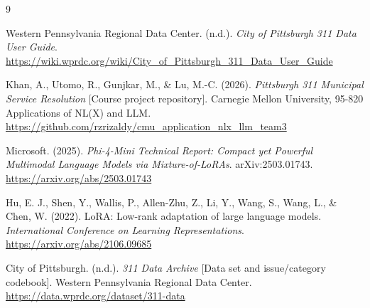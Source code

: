 \documentclass[11pt,letterpaper]{article}
\begin{document}
\begin{thebibliography}{9}
\raggedright
{} Western Pennsylvania Regional Data Center. (n.d.). \emph{City of Pittsburgh 311 Data User Guide}. \url{https://wiki.wprdc.org/wiki/City_of_Pittsburgh_311_Data_User_Guide}

 Khan, A., Utomo, R., Gunjkar, M., \& Lu, M.-C. (2026). \emph{Pittsburgh 311 Municipal Service Resolution} [Course project repository]. Carnegie Mellon University, 95-820 Applications of NL(X) and LLM. \url{https://github.com/rzrizaldy/cmu_application_nlx_llm_team3}

 Microsoft. (2025). \emph{Phi-4-Mini Technical Report: Compact yet Powerful Multimodal Language Models via Mixture-of-LoRAs}. arXiv:2503.01743. \url{https://arxiv.org/abs/2503.01743}

 Hu, E. J., Shen, Y., Wallis, P., Allen-Zhu, Z., Li, Y., Wang, S., Wang, L., \& Chen, W. (2022). LoRA: Low-rank adaptation of large language models. \emph{International Conference on Learning Representations}. \url{https://arxiv.org/abs/2106.09685}

 City of Pittsburgh. (n.d.). \emph{311 Data Archive} [Data set and issue/category codebook]. Western Pennsylvania Regional Data Center. \url{https://data.wprdc.org/dataset/311-data}
\end{thebibliography}
\end{document}
